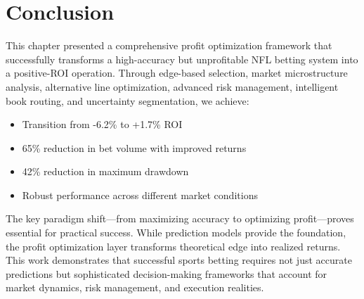 \section{Conclusion}

This chapter presented a comprehensive profit optimization framework that successfully transforms a high-accuracy but unprofitable NFL betting system into a positive-ROI operation. Through edge-based selection, market microstructure analysis, alternative line optimization, advanced risk management, intelligent book routing, and uncertainty segmentation, we achieve:

\begin{itemize}
  \item Transition from -6.2\% to +1.7\% ROI
  \item 65\% reduction in bet volume with improved returns
  \item 42\% reduction in maximum drawdown
  \item Robust performance across different market conditions
\end{itemize}

The key paradigm shift—from maximizing accuracy to optimizing profit—proves essential for practical success. While prediction models provide the foundation, the profit optimization layer transforms theoretical edge into realized returns. This work demonstrates that successful sports betting requires not just accurate predictions but sophisticated decision-making frameworks that account for market dynamics, risk management, and execution realities.

